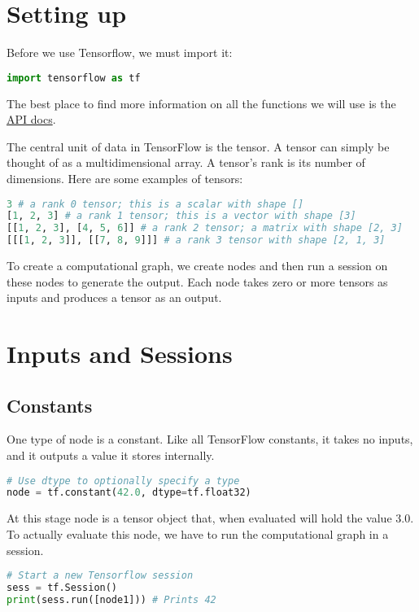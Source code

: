 \documentclass[Proceedings]{ascelike}
\begin{document}
\section{Setting up}
Before we use Tensorflow, we must import it:

\begin{lstlisting}[language=Python]
import tensorflow as tf
\end{lstlisting}
The best place to find more information on all the functions we will use is the \href{https://www.tensorflow.org/api_docs/}{API docs}.

The central unit of data in TensorFlow is the tensor. A tensor can simply be thought of as a multidimensional array. A tensor's rank is its number of dimensions. Here are some examples of tensors:
\begin{lstlisting}[language=Python]
3 # a rank 0 tensor; this is a scalar with shape []
[1, 2, 3] # a rank 1 tensor; this is a vector with shape [3]
[[1, 2, 3], [4, 5, 6]] # a rank 2 tensor; a matrix with shape [2, 3]
[[[1, 2, 3]], [[7, 8, 9]]] # a rank 3 tensor with shape [2, 1, 3]
\end{lstlisting}

To create a computational graph, we create nodes and then run a session on these nodes to generate the output. Each node takes zero or more tensors as inputs and produces a tensor as an output.

\section{Inputs and Sessions}
\subsection{Constants}
One type of node is a constant. Like all TensorFlow constants, it takes no inputs, and it outputs a value it stores internally.
\begin{lstlisting}[language=Python]
# Use dtype to optionally specify a type
node = tf.constant(42.0, dtype=tf.float32)
\end{lstlisting}
At this stage node is a tensor object that, when evaluated will hold the value 3.0. To actually evaluate this node, we have to run the computational graph in a session.

\begin{lstlisting}[language=Python]
# Start a new Tensorflow session
sess = tf.Session()
print(sess.run([node1])) # Prints 42
\end{lstlisting}
\end{document}
